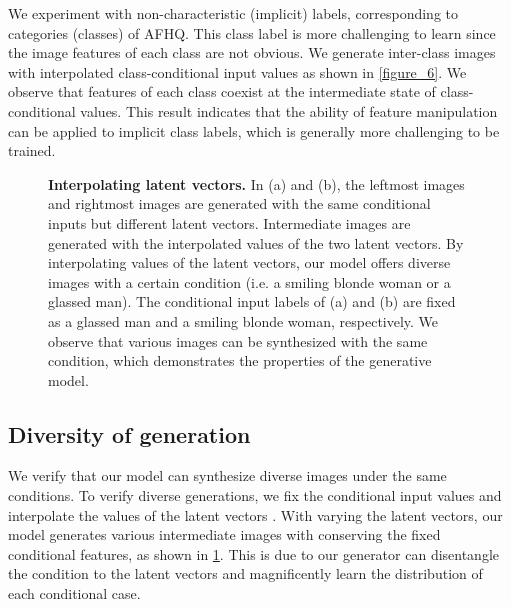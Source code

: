 \documentclass[nohyperref]{article}
\theoremstyle{plain}
\theoremstyle{definition}
\theoremstyle{remark}
\begin{document}
We experiment with non-characteristic (implicit) labels, corresponding to categories (classes) of AFHQ. This class label is more challenging to learn since the image features of each class are not obvious. We generate inter-class images with interpolated class-conditional input values as shown in \cref{figure_6}. We observe that features of each class coexist at the intermediate state of class-conditional values. This result indicates that the ability of feature manipulation can be applied to implicit class labels, which is generally more challenging to be trained.


\begin{figure}[h!]
\begin{center}
\vskip -0.15in
\caption{\textbf{Interpolating latent vectors.} In (a) and (b), the leftmost images and rightmost images are generated with the same conditional inputs but different latent vectors. Intermediate images are generated with the interpolated values of the two latent vectors. By interpolating values of the latent vectors, our model offers diverse images with a certain condition (i.e. a smiling blonde woman or a glassed man). The conditional input labels of (a) and (b) are fixed as a glassed man and a smiling blonde woman, respectively. We observe that various images can be synthesized with the same condition, which demonstrates the properties of the generative model.}
\label{figure_7}
\end{center}
\vskip -0.2in
\end{figure}



\subsection{Diversity of generation}
We verify that our model can synthesize diverse images under the same conditions. To verify diverse generations, we fix the conditional input values and interpolate the values of the latent vectors \cite{shmelkov2018good}. With varying the latent vectors, our model generates various intermediate images with conserving the fixed conditional features, as shown in \cref{figure_7}. This is due to our generator can disentangle the condition to the latent vectors and magnificently learn the distribution of each conditional case. 
\end{document}
